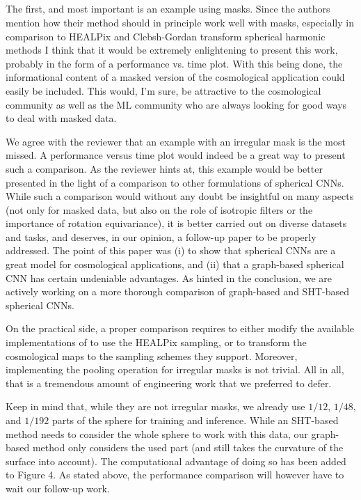 \documentclass[12pt,a4paper]{article}
\newcommand{\1}{\b{1}}              %
\newcommand{\0}{\b{0}}              %
\begin{document}
\subsection{}

\begin{mdframed}[style=comment]
The first, and most important is an example using masks. Since the authors mention how their method should in principle work well with masks, especially in comparison to HEALPix and Clebsh-Gordan transform spherical harmonic methods I think that it would be extremely enlightening to present this work, probably in the form of a performance vs. time plot. With this being done, the informational content of a masked version of the cosmological application could easily be included. This would, I'm sure, be attractive to the cosmological community as well as the ML community who are always looking for good ways to deal with masked data.
\end{mdframed}

We agree with the reviewer that an example with an irregular mask is the most missed.
A performance versus time plot would indeed be a great way to present such a comparison.
As the reviewer hints at, this example would be better presented in the light of a comparison to other formulations of spherical CNNs.
While such a comparison would without any doubt be insightful on many aspects (not only for masked data, but also on the role of isotropic filters or the importance of rotation equivariance), it is better carried out on diverse datasets and tasks, and deserves, in our opinion, a follow-up paper to be properly addressed.
The point of this paper was (i) to show that spherical CNNs are a great model for cosmological applications, and (ii) that a graph-based spherical CNN has certain undeniable advantages.
As hinted in the conclusion, we are actively working on a more thorough comparison of graph-based and SHT-based spherical CNNs.

On the practical side, a proper comparison requires to either modify the available implementations of \cite{cohen2018sphericalcnn,esteves2017sphericalcnn,kondor2018clebsch} to use the HEALPix sampling, or to transform the cosmological maps to the sampling schemes they support.
Moreover, implementing the pooling operation for irregular masks is not trivial.
All in all, that is a tremendous amount of engineering work that we preferred to defer.

Keep in mind that, while they are not irregular masks, we already use $1/12$, $1/48$, and $1/192$ parts of the sphere for training and inference.
While an SHT-based method needs to consider the whole sphere to work with this data, our graph-based method only considers the used part (and still takes the curvature of the surface into account).
The computational advantage of doing so has been added to Figure 4.
As stated above, the performance comparison will however have to wait our follow-up work.
\end{document}
